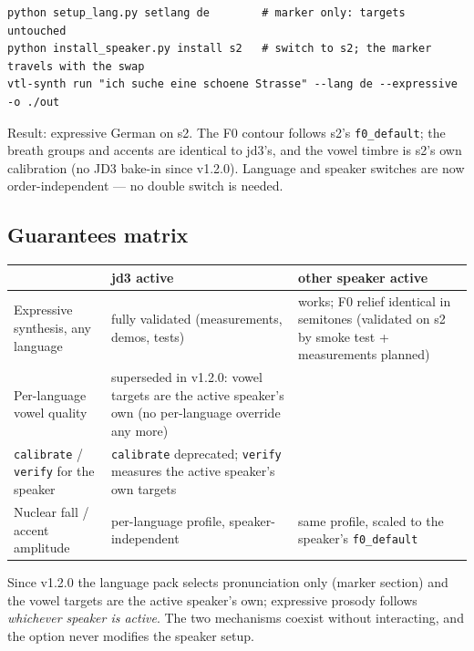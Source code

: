 \documentclass[11pt,a4paper]{article}
\begin{document}
\begin{lstlisting}[style=shell]
python setup_lang.py setlang de        # marker only: targets untouched
python install_speaker.py install s2   # switch to s2; the marker travels with the swap
vtl-synth run "ich suche eine schoene Strasse" --lang de --expressive -o ./out
\end{lstlisting}

Result: expressive German on s2. The F0 contour follows s2's
\texttt{f0\_default}; the breath groups and accents are identical
to jd3's, and the vowel timbre is s2's own calibration (no JD3
bake-in since v1.2.0). Language and speaker switches are now
order-independent --- no double switch is needed.

\subsection{Guarantees matrix}

\begin{small}
\begin{center}
\begin{tabularx}{\textwidth}{lXX}
\toprule
 & \textbf{jd3 active} & \textbf{other speaker active} \\
\midrule
Expressive synthesis, any language &
  fully validated (measurements, demos, tests) &
  works; F0 relief identical in semitones (validated on s2 by smoke test + measurements planned) \\
Per-language vowel quality &
  superseded in v1.2.0: vowel targets are the active
  speaker's own (no per-language override any more) \\
\texttt{calibrate} / \texttt{verify} for the speaker &
  \texttt{calibrate} deprecated; \texttt{verify} measures
  the active speaker's own targets \\
Nuclear fall / accent amplitude &
  per-language profile, speaker-independent &
  same profile, scaled to the speaker's \texttt{f0\_default} \\
\bottomrule
\end{tabularx}
\end{center}
\end{small}

\begin{callout}
Since v1.2.0 the language pack selects pronunciation only
(marker section) and the vowel targets are the active
speaker's own;
expressive prosody follows \emph{whichever speaker is active}.
The two mechanisms coexist without interacting, and the option
never modifies the speaker setup.
\end{callout}
\end{document}
